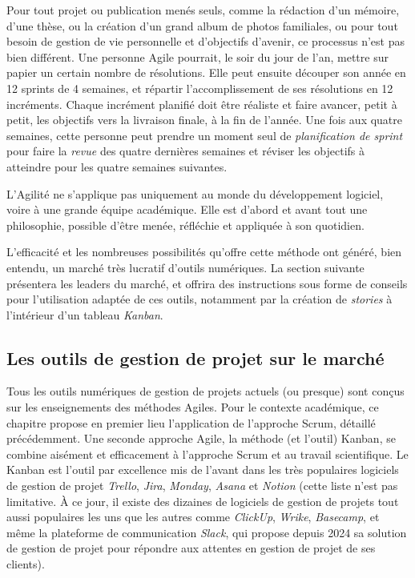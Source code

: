 \documentclass[
  letterpaper,
  DIV=11,
  numbers=noendperiod,
  oneside]{scrreprt}
\begin{document}
Pour tout projet ou publication menés seuls, comme la rédaction d'un
mémoire, d'une thèse, ou la création d'un grand album de photos
familiales, ou pour tout besoin de gestion de vie personnelle et
d'objectifs d'avenir, ce processus n'est pas bien différent. Une
personne Agile pourrait, le soir du jour de l'an, mettre sur papier un
certain nombre de résolutions. Elle peut ensuite découper son année en
12 sprints de 4 semaines, et répartir l'accomplissement de ses
résolutions en 12 incréments. Chaque incrément planifié doit être
réaliste et faire avancer, petit à petit, les objectifs vers la
livraison finale, à la fin de l'année. Une fois aux quatre semaines,
cette personne peut prendre un moment seul de \emph{planification de
sprint} pour faire la \emph{revue} des quatre dernières semaines et
réviser les objectifs à atteindre pour les quatre semaines suivantes.

L'Agilité ne s'applique pas uniquement au monde du développement
logiciel, voire à une grande équipe académique. Elle est d'abord et
avant tout une philosophie, possible d'être menée, réfléchie et
appliquée à son quotidien.

L'efficacité et les nombreuses possibilités qu'offre cette méthode ont
généré, bien entendu, un marché très lucratif d'outils numériques. La
section suivante présentera les leaders du marché, et offrira des
instructions sous forme de conseils pour l'utilisation adaptée de ces
outils, notamment par la création de \emph{stories} à l'intérieur d'un
tableau \emph{Kanban}.

\hypertarget{les-outils-de-gestion-de-projet-sur-le-marchuxe9}{%
\subsection{Les outils de gestion de projet sur le
marché}\label{les-outils-de-gestion-de-projet-sur-le-marchuxe9}}

Tous les outils numériques de gestion de projets actuels (ou presque)
sont conçus sur les enseignements des méthodes Agiles. Pour le contexte
académique, ce chapitre propose en premier lieu l'application de
l'approche Scrum, détaillé précédemment. Une seconde approche Agile, la
méthode (et l'outil) Kanban, se combine aisément et efficacement à
l'approche Scrum et au travail scientifique. Le Kanban est l'outil par
excellence mis de l'avant dans les très populaires logiciels de gestion
de projet \emph{Trello}, \emph{Jira}, \emph{Monday}, \emph{Asana} et
\emph{Notion} (cette liste n'est pas limitative. À ce jour, il existe
des dizaines de logiciels de gestion de projets tout aussi populaires
les uns que les autres comme \emph{ClickUp}, \emph{Wrike},
\emph{Basecamp}, et même la plateforme de communication \emph{Slack},
qui propose depuis 2024 sa solution de gestion de projet pour répondre
aux attentes en gestion de projet de ses clients).
\end{document}
